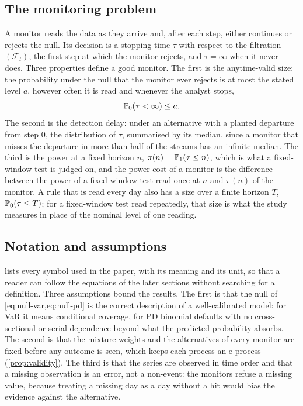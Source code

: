 \subsection{The monitoring problem}
\label{sec:problem-monitoring}

A monitor reads the data as they arrive and, after each step, either continues or rejects the null. Its decision is a stopping time $\tau$ with respect to the filtration $(\mathcal F_t)$, the first step at which the monitor rejects, and $\tau=\infty$ when it never does.
Three properties define a good monitor. The first is the anytime-valid size: the probability under the null that the monitor ever rejects is at most the stated level $a$, however often it is read and
whenever the analyst stops,
\begin{equation}
\mathbb{P}_0(\tau<\infty)\le a .
\label{eq:anytime-size}
\end{equation}
The second is the detection delay: under an alternative with a planted departure from step $0$, the distribution of $\tau$, summarised by its median, since a monitor that misses the departure in
more than half of the streams has an infinite median. The third is the power at a fixed horizon $n$, $\pi(n)=\mathbb{P}_1(\tau\le n)$, which is what a fixed-window test is judged on, and the power cost of a monitor is the difference between the power of a fixed-window test read once at $n$ and $\pi(n)$ of the monitor.
A rule that is read every day also has a size over a finite horizon $T$, $\mathbb{P}_0(\tau\le T)$; for a fixed-window test read repeatedly, that size is what the study measures in
place of the nominal level of one reading.

\subsection{Notation and assumptions}
\label{sec:problem-notation}

 lists every symbol used in the paper, with its meaning and its unit, so that a reader can follow the equations of the later sections without searching for a definition. Three assumptions bound the results. The first is that the null of \cref{eq:null-var,eq:null-pd} is the correct description of a
well-calibrated model: for VaR it means conditional coverage, for PD binomial defaults with no cross-sectional or serial dependence beyond what the predicted probability absorbs. The second is that the
mixture weights and the alternatives of every monitor are fixed before any outcome is seen, which keeps each process an e-process (\cref{prop:validity}). The third is that the series are observed in time order and
that a missing observation is an error, not a non-event: the monitors refuse a missing value, because treating a missing day as a day without a hit would bias the evidence against the alternative.

